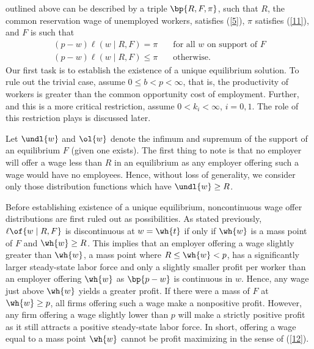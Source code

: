\documentclass[12pt]{article}
\newcommand{\highlightB}[1]{{\emph{\color{MyBlue}{#1}}}}
\newcommand{\highlightP}[1]{{\emph{\color{MyPink}{#1}}}}
\theoremstyle{definition}
\begin{document}
\highlightB{An equilibrium solution to the search and wage posting game} outlined above can be described by a triple $\bp{R, F, \pi}$, such that $R$, the common reservation wage of unemployed workers, satisfies (\ref{5}), $\pi$ satisfies (\ref{11}), and $F$ is such that 
\begin{equation}
    \label{12}
    \begin{array}{ll}
        (p-w) \ell(w \mid R, F)=\pi \quad & \text{for all $w$ on support of $F$} \\
        (p-w) \ell(w \mid R, F) \leq \pi \quad & \text{otherwise.}
    \end{array}
\end{equation}
Our first task is to establish the existence of a unique equilibrium solution. To rule out the trivial case, assume $0 \leq b < p < \infty$, that is, the productivity of workers is greater than the common opportunity cost of employment. Further, and this is a more critical restriction, assume $0 < k_i < \infty$, $i = 0, 1$. The role of this restriction plays is discussed later. 

Let $\undl{w}$ and $\ol{w}$ denote the infimum and supremum of the support of an equilibrium $F$ (given one exists). The first thing to note is that no employer will offer a wage less than $R$ in an equilibrium as any employer offering such a wage would have no employees. Hence, without loss of generality, we consider only those distribution functions which have $\undl{w} \geq R$.

Before establishing existence of a unique equilibrium, noncontinuous wage offer distributions are first ruled out as possibilities. As stated previously, $\ell\of{w \mid R, F}$ is discontinuous at $w = \wh{t}$ if only if $\wh{w}$ is a mass point of $F$ and $\wh{w} \geq R$. This implies that an employer offering a wage slightly greater than $\wh{w}$, a mass point where $R \leq \wh{w} < p$, has a significantly larger steady-state labor force and only a slightly smaller profit per worker than an employer offering $\wh{w}$ as $\bp{p-w}$ is continuous in $w$. Hence, any wage just above $\wh{w}$ yields a greater profit. If there were a mass of $F$ at $\wh{w} \geq p$, all firms offering such a wage make a nonpositive profit. However, any firm offering a wage slightly lower than $p$ will make a strictly positive profit as it still attracts a positive steady-state labor force. In short, offering a wage equal to a mass point $\wh{w}$ cannot be profit maximizing in the sense of (\ref{12}). \highlightP{Note, this conclusion rules out a single market wage as an equilibrium possibility. }
\end{document}
